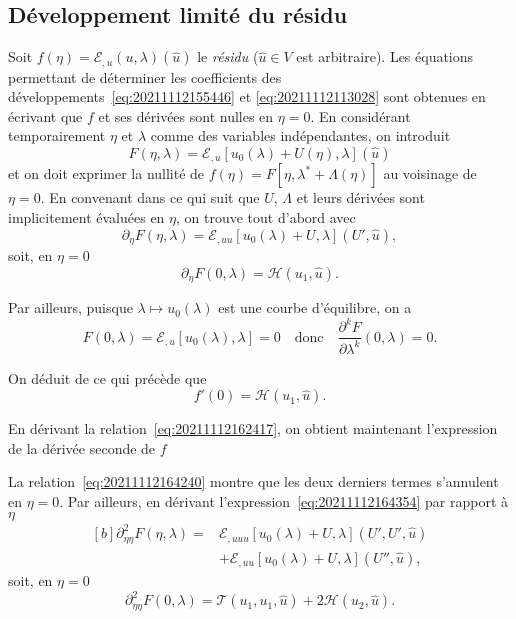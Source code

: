 \documentclass[12pt, final]{amsart}
\begin{document}
\subsection{Développement limité du résidu}
\label{sec:20211112182000}

Soit \(f(\eta)=\mathcal E_{,u}(u, \lambda)(\hat{u})\) le \emph{résidu}
(\(\hat{u}\in V\) est arbitraire). Les équations permettant de déterminer les
coefficients des développements~\eqref{eq:20211112155446} et
\eqref{eq:20211112113028} sont obtenues en écrivant que \(f\) et ses dérivées
sont nulles en \(\eta=0\). En considérant temporairement \(\eta\) et
\(\lambda\) comme des variables indépendantes, on introduit
\begin{equation}
  F(\eta, \lambda)=\mathcal E_{,u}[u_0(\lambda)+U(\eta), \lambda](\hat{u})
\end{equation}
et on doit exprimer la nullité de
\(f(\eta)=F[\eta, \lambda^\ast+\Lambda(\eta)]\) au voisinage de \(\eta=0\). En
convenant dans ce qui suit que \(U\), \(\Lambda\) et leurs dérivées sont
implicitement évaluées en \(\eta\), on trouve tout d'abord
avec
\begin{equation}
  \label{eq:20211112164354}
  \partial_\eta F(\eta, \lambda)
  =\mathcal E_{,uu}[u_0(\lambda)+U, \lambda](U', \hat{u}),
\end{equation}
soit, en \(\eta=0\)
\begin{equation}
  \label{eq:20211112165323}
  \partial_\eta F(0, \lambda)=\mathcal H(u_1, \hat{u}).
\end{equation}

Par ailleurs, puisque \(\lambda\mapsto u_0(\lambda)\) est une courbe d'équilibre, on a
\begin{equation}
  \label{eq:20211112164240}
  F(0, \lambda)=\mathcal E_{,u}[u_0(\lambda), \lambda]=0
  \quad\text{donc}\quad
  \frac{\partial^kF}{\partial\lambda^k}(0, \lambda)=0.
\end{equation}

On déduit de ce qui précède que
\begin{equation}
  \label{eq:20211112182300}
  f'(0)=\mathcal H(u_1, \hat{u}).
\end{equation}

En dérivant la relation~\eqref{eq:20211112162417}, on obtient maintenant l'expression de la dérivée seconde de \(f\)

La relation~\eqref{eq:20211112164240} montre que les deux derniers termes
s'annulent en \(\eta=0\). Par ailleurs, en dérivant
l'expression~\eqref{eq:20211112164354} par rapport à \(\eta\)
\begin{equation}
  \label{eq:20211112172446}
  \begin{aligned}[b]
    \partial_{\eta\eta}^2F(\eta, \lambda)={}&
    \mathcal E_{,uuu}[u_0(\lambda)+U, \lambda](U', U', \hat{u})\\
    &+\mathcal E_{,uu}[u_0(\lambda)+U, \lambda](U'', \hat{u}),
  \end{aligned}
\end{equation}
soit, en \(\eta=0\)
\begin{equation}
  \label{eq:20211112165830}
  \partial_{\eta\eta}^2F(0, \lambda)=\mathcal T(u_1, u_1, \hat{u})
  +2\mathcal H(u_2, \hat{u}).
\end{equation}
\end{document}
